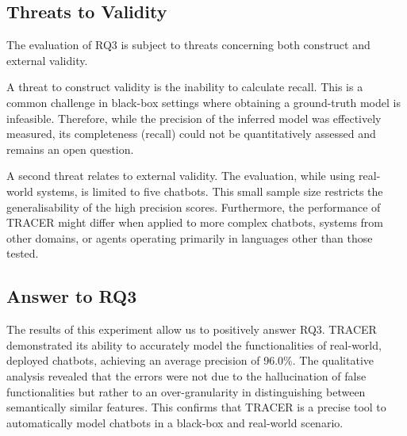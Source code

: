\subsection{Threats to Validity}
The evaluation of RQ3
is subject to threats concerning
both construct and external validity.

A threat to construct validity
is the inability to calculate recall.
This is a common challenge in black-box settings
where obtaining a ground-truth model is infeasible.
Therefore, while the precision of the inferred model
was effectively measured,
its completeness (recall) could not be
quantitatively assessed and remains an open question.

A second threat relates to external validity.
The evaluation, while using real-world systems,
is limited to five chatbots.
This small sample size
restricts the generalisability of the high precision scores.
Furthermore, the performance of TRACER
might differ when applied to more complex chatbots,
systems from other domains,
or agents operating primarily in languages other than those tested.

\subsection{Answer to RQ3}

The results of this experiment allow us to positively answer RQ3.
\ac{TRACER} demonstrated its ability
to accurately model the functionalities of
real-world, deployed chatbots, achieving an average precision of 96.0\%.
The qualitative analysis revealed that
the errors were not due to the hallucination of false functionalities
but rather to an over-granularity in distinguishing
between semantically similar features.
This confirms that \ac{TRACER} is a precise tool
to automatically model chatbots
in a black-box and real-world scenario.
